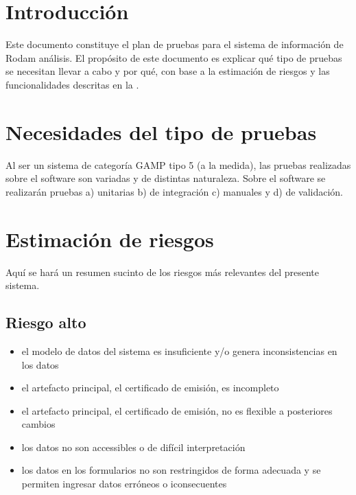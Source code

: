 \documentclass[letterpaper,10pt,spanish]{sphinxmanual}
\begin{document}
\section{Introducción}
\label{\detokenize{requerimientos/STPD:introduccion}}
Este documento constituye el plan de pruebas para el sistema
de información de Rodam análisis. El propósito de este
documento es explicar qué tipo de pruebas se necesitan llevar
a cabo y por qué, con base a la estimación de riesgos y las
funcionalidades descritas en la  .


\section{Necesidades del tipo de pruebas}
\label{\detokenize{requerimientos/STPD:necesidades-del-tipo-de-pruebas}}
Al ser un sistema de categoría GAMP tipo 5 (a la medida), las pruebas
realizadas sobre el software son variadas y de distintas naturaleza.
Sobre el software se realizarán pruebas a) unitarias b) de integración
c) manuales y d) de validación.


\section{Estimación de riesgos}
\label{\detokenize{requerimientos/STPD:estimacion-de-riesgos}}
Aquí se hará un resumen sucinto de los riesgos más relevantes
del presente sistema.


\subsection{Riesgo alto}
\label{\detokenize{requerimientos/STPD:riesgo-alto}}\begin{itemize}
\item {} 
el modelo de datos del sistema es insuficiente y/o genera inconsistencias en los datos

\item {} 
el artefacto principal, el certificado de emisión, es incompleto

\item {} 
el artefacto principal, el certificado de emisión, no es flexible a posteriores cambios

\item {} 
los datos no son accessibles o de difícil interpretación

\item {} 
los datos en los formularios no son restringidos de forma adecuada y se permiten ingresar datos erróneos o iconsecuentes

\end{itemize}
\end{document}
